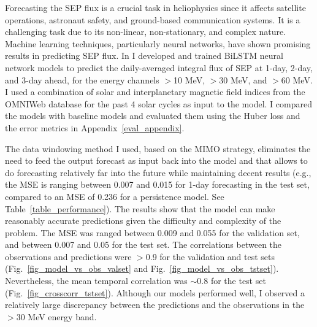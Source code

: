 Forecasting the SEP flux is a crucial task in heliophysics since it affects satellite operations, astronaut safety, and ground-based communication systems. It is a challenging task due to its non-linear, non-stationary, and complex nature. Machine learning techniques, particularly neural networks, have shown promising results in predicting SEP flux.
In \citet{mnedal_2023a} I developed and trained BiLSTM neural network models to predict the daily-averaged integral flux of SEP at 1-day, 2-day, and 3-day ahead, for the energy channels $>$10 MeV, $>$30 MeV, and $>$60 MeV.
I used a combination of solar and interplanetary magnetic field indices from the OMNIWeb database for the past 4 solar cycles as input to the model.
I compared the models with baseline models and evaluated them using the Huber loss and the error metrics in Appendix~\ref{eval_appendix}.

The data windowing method I used, based on the MIMO strategy, eliminates the need to feed the output forecast as input back into the model and that allows to do forecasting relatively far into the future while maintaining decent results (e.g., the MSE is ranging between 0.007 and 0.015 for 1-day forecasting in the test set, compared to an MSE of 0.236 for a persistence model. See Table~\ref{table_performance}).
The results show that the model can make reasonably accurate predictions given the difficulty and complexity of the problem.
The MSE was ranged between 0.009 and 0.055 for the validation set, and between 0.007 and 0.05 for the test set.
The correlations between the observations and predictions were $>$0.9 for the validation and test sets (Fig.~\ref{fig_model_vs_obs_valset} and Fig.~\ref{fig_model_vs_obs_tstset}).
Nevertheless, the mean temporal correlation was $\sim$0.8 for the test set (Fig.~\ref{fig_crosscorr_tstset}).
Although our models performed well, I observed a relatively large discrepancy between the predictions and the observations in the $>$30 MeV energy band.

